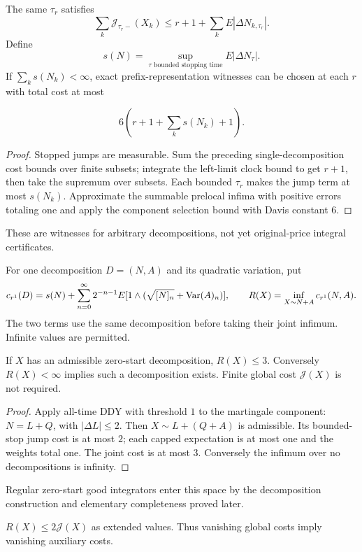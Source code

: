 \begin{lemma}
The same $\tau_r$ satisfies
\[
 \sum_k\mathcal J_{\tau_r-}(X_k)\leq r+1+\sum_kE|\Delta N_{k,\tau_r}|.
\]
Define
\[
 s(N)=\sup_{\tau\text{ bounded stopping time}}E|\Delta N_\tau|.
\]
If $\sum_ks(N_k)<\infty$, exact prefix-representation witnesses can be
chosen at each $r$ with total cost at most

\[
 6(r+1+\sum_ks(N_k)+1).
\]
\end{lemma}
\begin{proof}
Stopped jumps are measurable. Sum the preceding single-decomposition cost
bounds over finite subsets; integrate the left-limit clock bound to get
$r+1$, then take the supremum over subsets. Each bounded $\tau_r$ makes the
jump term at most $s(N_k)$. Approximate the summable prelocal infima with
positive errors totaling one and apply the component selection bound with
Davis constant $6$.
\end{proof}
These are witnesses for arbitrary decompositions, not yet original-price
integral certificates.
\begin{definition}
For one decomposition $D=(N,A)$ and its quadratic variation, put
\[
 c_{r^1}(D)=s(N)+\sum_{n=0}^\infty2^{-n-1}
 E[1\wedge(\sqrt{[N]_n}+\operatorname{Var}(A)_n)],\qquad
 R(X)=\inf_{X\sim N+A}c_{r^1}(N,A).
\]
The two terms use the same decomposition before taking their joint infimum.
Infinite values are permitted.
\end{definition}
\begin{lemma}
If $X$ has an admissible zero-start decomposition, $R(X)\leq3$.
Conversely $R(X)<\infty$ implies such a decomposition exists.
Finite global cost $\mathcal J(X)$ is not required.
\end{lemma}
\begin{proof}
Apply all-time DDY with threshold $1$ to the martingale component:
$N=L+Q$, with $|\Delta L|\leq2$. Then $X\sim L+(Q+A)$ is admissible.
Its bounded-stop jump cost is at most $2$; each capped expectation is at most
one and the weights total one. The joint cost is at most $3$.
Conversely the infimum over no decompositions is infinity.
\end{proof}
Regular zero-start good integrators enter this space by the decomposition
construction and elementary completeness proved later.
\begin{lemma}
$R(X)\leq2\mathcal J(X)$ as extended values. Thus vanishing global costs
imply vanishing auxiliary costs.
\end{lemma}
